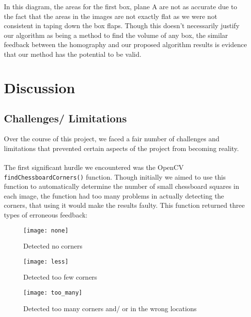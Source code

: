 \documentclass[11pt, twoside, reqno]{book}
\begin{document}
 In this diagram, the areas for the first box, plane A are not as accurate due to the fact that the areas in the images are not exactly flat as we were not consistent in taping down the box flaps. Though this doesn't necessarily justify our algorithm as being a method to find the volume of any box, the similar feedback between the homography and our proposed algorithm results is evidence that our method has the potential to be valid. 


\chapter{Discussion}
\label{label}

\section{Challenges/ Limitations} 

Over the course of this project, we faced a fair number of challenges and limitations that prevented certain aspects of the project from becoming reality. 
\\ \\
The first significant hurdle we encountered was the OpenCV \texttt{findChessboardCorners()} function. Though initially we aimed to use this function to automatically determine the number of small chessboard squares in each image, the function had too many problems in actually detecting the corners, that using it would make the results faulty. This function returned three types of erroneous feedback: \\



\begin{figure} [H]

		 \graphicspath{ {images/} }
		\caption{Detected no corners }

		\texttt{[image: none]} 
	
\end{figure}

\begin{figure}[H]
 \graphicspath{ {images/} }
 \caption{Detected too few corners }

\texttt{[image: less]} 
\end{figure}

\begin{figure}
	 \graphicspath{ {images/} }
	\caption{Detected too many corners and/ or in the wrong locations}
	\texttt{[image: too\_many]}
\end{figure}
 
\end{document}
